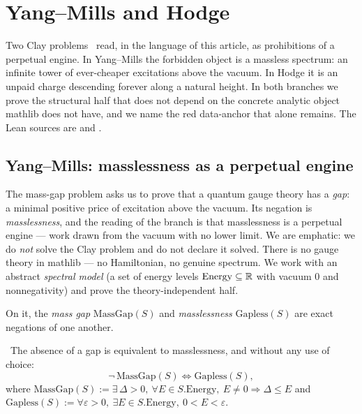 \section{Yang--Mills and Hodge}\label{sec:ymhodge}

Two Clay problems~\cite{clay-ym,clay-hodge} read, in the language of this article, as
prohibitions of a perpetual engine. In Yang--Mills the forbidden object is a massless spectrum:
an infinite tower of ever-cheaper excitations above the vacuum. In Hodge it is an unpaid charge
descending forever along a natural height. In both branches we prove the structural half that does
not depend on the concrete analytic object mathlib does not have, and we name the red data-anchor
that alone remains. The Lean sources are  and
.

\subsection{Yang--Mills: masslessness as a perpetual engine}

The mass-gap problem asks us to prove that a quantum gauge theory has a \emph{gap}: a minimal
positive price of excitation above the vacuum. Its negation is \emph{masslessness}, and the reading
of the branch is that masslessness is a perpetual engine --- work drawn from the vacuum with no
lower limit. We are emphatic: we do \emph{not} solve the Clay problem and do not declare it solved.
There is no gauge theory in mathlib --- no Hamiltonian, no genuine spectrum. We work with an
abstract \emph{spectral model}  (a set of energy levels
$\mathrm{Energy}\subseteq\mathbb{R}$ with vacuum $0$ and nonnegativity) and prove the theory-independent
half.

On it, the \emph{mass gap} $\mathrm{MassGap}(S)$ and \emph{masslessness} $\mathrm{Gapless}(S)$ are
exact negations of one another.

\begin{theorem}\label{thm:not_massGap_iff_gapless}
\green{}\ The absence of a gap is equivalent to masslessness, and without any use of choice:
\[
  \neg\,\mathrm{MassGap}(S)\iff\mathrm{Gapless}(S),
\]
where $\mathrm{MassGap}(S):=\exists\,\Delta>0,\ \forall E\in S.\mathrm{Energy},\ E\neq 0\Rightarrow\Delta\le E$
and $\mathrm{Gapless}(S):=\forall\varepsilon>0,\ \exists E\in S.\mathrm{Energy},\ 0<E<\varepsilon$.
\end{theorem}

